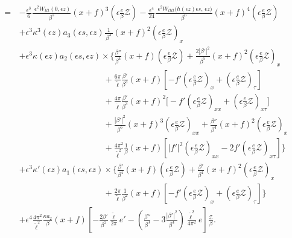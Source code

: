 \documentclass[10pt, reqno]{amsart}
\numberwithin{equation}{section}
\theoremstyle{definition}
\begin{document}
{{\begin{align}
\nonumber\\[2mm]
\,=\,& - \frac{\epsilon^3}{6} \frac{\, \, \epsilon^2 W_{ttt}(0, \epsilon z)}{\beta^5} (x+f)^3 \left(\epsilon\frac{e}{\beta}{\mathcal Z} \right)
 -\frac{\epsilon^4}{24} \frac{\, \, \epsilon^2 W_{tttt}\big(\hbar(\epsilon z)\epsilon s, \, \epsilon z\big)}{\beta^6} (x+f)^4\left(\epsilon\frac{e}{\beta}{\mathcal Z} \right)
\nonumber\\[2mm]
&
 +\epsilon^3 \kappa^3(\epsilon z) a_3(\epsilon s, \epsilon z) \frac{1}{\, \beta^3\, }(x+f)^2\left(\epsilon\frac{e}{\beta}{\mathcal Z} \right)_{x}
\nonumber\\[2mm]
&
 + \epsilon^3 \kappa(\epsilon z) a_2(\epsilon s, \epsilon z)\times
\Bigg\{
\frac{\beta''} {\beta^4} (x+f) \left(\epsilon\frac{e}{\beta}{\mathcal Z} \right)
+\frac{2|\beta'|^2}{\beta^5} (x+f)^2 \left(\epsilon\frac{e}{\beta}{\mathcal Z} \right)_x
\nonumber\\[2mm]
&\qquad\qquad\qquad\qquad\qquad
+\frac{ 6\pi}{ {\tilde\ell}}\frac{\beta'} {\beta^3} (x+f)\left[-f'\left(\epsilon\frac{e}{\beta}{\mathcal Z} \right)_x +\left(\epsilon\frac{e}{\beta}{\mathcal Z} \right)_\tau\right]
\nonumber\\[2mm]
&\qquad\qquad\qquad\qquad\qquad
+\frac{ 4\pi}{ {\tilde\ell}}\frac{\beta'} {\beta^3} (x+f)^2\Bigg[- f' \left(\epsilon\frac{e}{\beta}{\mathcal Z} \right)_{xx} +\left(\epsilon\frac{e}{\beta}{\mathcal Z} \right)_{x\tau}\Bigg]
\nonumber\\[2mm]
&\qquad\qquad\qquad\qquad\qquad
+ \frac{|\beta'|^2}{\beta^5} (x+f)^3\left(\epsilon\frac{e}{\beta}{\mathcal Z} \right)_{xx}
+ \frac{\beta''}{\beta^4} (x+f)^2 \left(\epsilon\frac{e}{\beta}{\mathcal Z} \right)_{x}
\nonumber\\[2mm]
&\qquad\qquad\qquad\qquad\qquad
+\frac{ 4\pi^2} {{\tilde\ell}^2}\frac{1}{\beta} (x+f)\left[ |f'|^2 \left(\epsilon\frac{e}{\beta}{\mathcal Z} \right)_{xx} -2f' \left(\epsilon\frac{e}{\beta}{\mathcal Z} \right)_{x\tau}\right]
\Bigg\}
\nonumber\\[2mm]
&+
\epsilon^3 \kappa'(\epsilon z)a_1(\epsilon s, \epsilon z)\times
\Bigg\{
\frac{\beta'}{\beta^4} (x+f)\left(\epsilon\frac{e}{\beta}{\mathcal Z} \right)
+\frac{\beta'}{\beta^4} (x+f)^2 \left(\epsilon\frac{e}{\beta}{\mathcal Z} \right)_{x}
\nonumber\\[2mm]
&\qquad\qquad\qquad\qquad\qquad
+\frac{ 2\pi}{ {\tilde\ell}}\frac{1}{ \beta^2} (x+f)\left[-f'\left(\epsilon\frac{e}{\beta}{\mathcal Z} \right)_x +\left(\epsilon\frac{e}{\beta}{\mathcal Z} \right)_\tau\right]
\Bigg\}
\nonumber\\[2mm]
&+
\epsilon^4\frac{ 4\pi^2} {{\tilde\ell}^2} \frac{\kappa a_2}{\, \beta\, } (x+f)
\left[- \frac{2\beta'} {\beta^2} \frac{\tilde \ell} {2\pi} e'
-\left(\frac{\beta''} {\beta^3} - 3\frac{|\beta'|^2} {\beta^4} \right) \frac{\tilde \ell^2} {4\pi^2}e
\right]\frac{\mathcal Z}\beta.
\end{align}


}}
\end{document}
